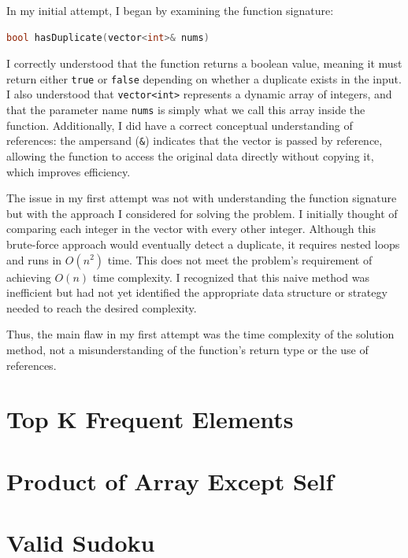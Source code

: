 \documentclass[12pt,letterpaper]{book}
\theoremstyle{definition}
\theoremstyle{remark}
\begin{document}
In my initial attempt, I began by examining the function signature:

\begin{lstlisting}[language=C++]
bool hasDuplicate(vector<int>& nums)
\end{lstlisting}

I correctly understood that the function returns a boolean value, meaning it must return either \texttt{true} or \texttt{false} depending on whether a duplicate exists in the input. I also understood that \texttt{vector<int>} represents a dynamic array of integers, and that the parameter name \texttt{nums} is simply what we call this array inside the function. Additionally, I did have a correct conceptual understanding of references: the ampersand (\texttt{\&}) indicates that the vector is passed by reference, allowing the function to access the original data directly without copying it, which improves efficiency.

The issue in my first attempt was not with understanding the function signature but with the approach I considered for solving the problem. I initially thought of comparing each integer in the vector with every other integer. Although this brute-force approach would eventually detect a duplicate, it requires nested loops and runs in $O(n^2)$ time. This does not meet the problem's requirement of achieving $O(n)$ time complexity. I recognized that this naive method was inefficient but had not yet identified the appropriate data structure or strategy needed to reach the desired complexity.

Thus, the main flaw in my first attempt was the time complexity of the solution method, not a misunderstanding of the function's return type or the use of references.

\section{Top K Frequent Elements}


\section{Product of Array Except Self}


\section{Valid Sudoku}
\end{document}
